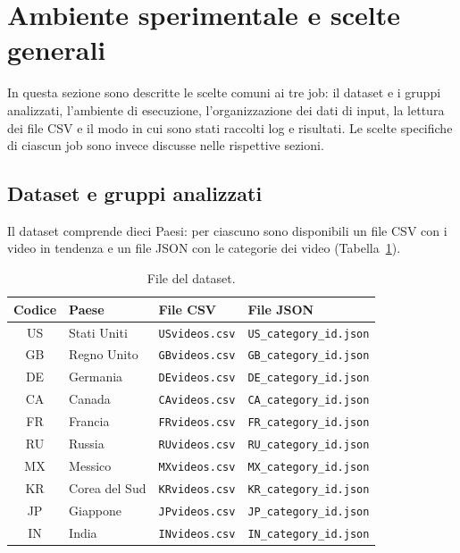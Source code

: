 \documentclass[12pt, a4paper]{article}
\begin{document}
\tableofcontents
\newpage

\setcounter{section}{-1}
\section{Ambiente sperimentale e scelte generali}
\label{sec:generale}

In questa sezione sono descritte le scelte comuni ai tre job:
il dataset e i gruppi analizzati, l'ambiente di esecuzione,
l'organizzazione dei dati di input, la lettura dei file CSV
e il modo in cui sono stati raccolti log e risultati.
Le scelte specifiche di ciascun job sono invece discusse
nelle rispettive sezioni.

\subsection{Dataset e gruppi analizzati}
\label{sec:gruppi}

Il dataset comprende dieci Paesi: per ciascuno sono
disponibili un file CSV con i video in tendenza
e un file JSON con le categorie dei video
(Tabella~\ref{tab:file}).

\begin{table}[H]
\centering
\small
\begin{tabular}{|c|l|l|l|}
\hline
\textbf{Codice} & \textbf{Paese} & \textbf{File CSV} & \textbf{File JSON} \\
\hline
US & Stati Uniti & \texttt{USvideos.csv} & \texttt{US\_category\_id.json} \\
GB & Regno Unito & \texttt{GBvideos.csv} & \texttt{GB\_category\_id.json} \\
DE & Germania & \texttt{DEvideos.csv} & \texttt{DE\_category\_id.json} \\
CA & Canada & \texttt{CAvideos.csv} & \texttt{CA\_category\_id.json} \\
FR & Francia & \texttt{FRvideos.csv} & \texttt{FR\_category\_id.json} \\
RU & Russia & \texttt{RUvideos.csv} & \texttt{RU\_category\_id.json} \\
MX & Messico & \texttt{MXvideos.csv} & \texttt{MX\_category\_id.json} \\
KR & Corea del Sud & \texttt{KRvideos.csv} & \texttt{KR\_category\_id.json} \\
JP & Giappone & \texttt{JPvideos.csv} & \texttt{JP\_category\_id.json} \\
IN & India & \texttt{INvideos.csv} & \texttt{IN\_category\_id.json} \\
\hline
\end{tabular}
\caption{File del dataset.}
\label{tab:file}
\end{table}
\end{document}
